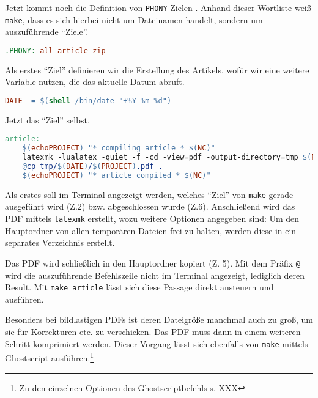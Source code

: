\documentclass[ngerman]{dtk}
\begin{document}
Jetzt kommt noch die Definition von \texttt{PHONY}-Zielen \parencite[13--15]{gnu-make}.
Anhand dieser Wortliste weiß \texttt{make},
dass es sich hierbei nicht um Dateinamen handelt,
sondern um auszuführende \enquote{Ziele}.
\begin{lstlisting}[style=number,language=make]
.PHONY: all article zip
\end{lstlisting}


Als erstes \enquote{Ziel} definieren wir die Erstellung des Artikels,
wofür wir eine weitere Variable nutzen, die das aktuelle Datum abruft.
\begin{lstlisting}[style=number,language=make]
DATE  = $(shell /bin/date "+%Y-%m-%d")
\end{lstlisting}

Jetzt das \enquote{Ziel} selbst.
\begin{lstlisting}[style=number,language=make]
article:
	$(echoPROJECT) "* compiling article * $(NC)"
	latexmk -lualatex -quiet -f -cd -view=pdf -output-directory=tmp $(PROJECT).tex
	@cp tmp/$(DATE)/$(PROJECT).pdf .
	$(echoPROJECT) "* article compiled * $(NC)"
\end{lstlisting}
Als erstes soll im Terminal angezeigt werden, welches \enquote{Ziel}
von \texttt{make} gerade ausgeführt  wird (Z.2) bzw. abgeschlossen wurde (Z.6).
Anschließend wird das PDF mittels \texttt{latexmk} erstellt, wozu weitere Optionen angegeben sind:
Um den Hauptordner von allen temporären Dateien frei zu halten,
werden diese in ein separates Verzeichnis erstellt.

Das PDF wird schließlich in den Hauptordner kopiert (Z. 5).
Mit dem Präfix \texttt{@} wird die auszuführende Befehlszeile nicht
im Terminal angezeigt, lediglich deren Result.
Mit \texttt{make article} lässt sich diese Passage direkt ansteuern und ausführen.

Besonders bei bildlastigen PDFs ist deren Dateigröße manchmal auch zu groß,
um sie für Korrekturen etc. zu verschicken.
Das PDF muss dann in einem weiteren Schritt komprimiert werden.
Dieser Vorgang lässt sich ebenfalls von \texttt{make} mittels Ghostscript ausführen.\footnote{Zu den einzelnen Optionen des Ghostscriptbefehls s. XXX}
\end{document}
